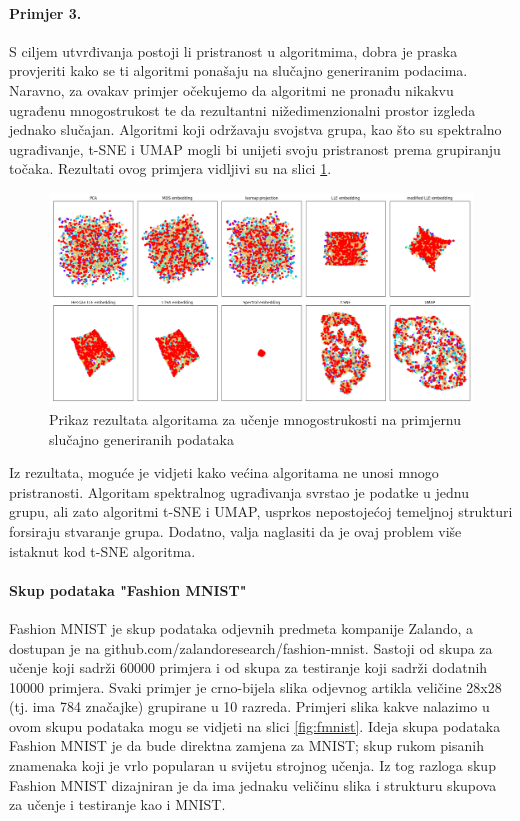 \documentclass[times, utf8, diplomski]{fer}
\begin{document}
\paragraph{Primjer 3.}
S ciljem utvrđivanja postoji li pristranost u algoritmima, dobra je praska provjeriti kako se ti algoritmi ponašaju na slučajno generiranim podacima. Naravno, za ovakav primjer očekujemo da algoritmi ne pronađu nikakvu ugrađenu mnogostrukost te da rezultantni nižedimenzionalni prostor izgleda jednako slučajan. Algoritmi koji održavaju svojstva grupa, kao što su spektralno ugrađivanje, t-SNE i UMAP mogli bi unijeti svoju pristranost prema grupiranju točaka. Rezultati ovog primjera vidljivi su na slici \ref{fig:xr}.

\begin{figure}[htb]
    \centering
    \includegraphics[width=\textwidth]{resources/images/reduction/compare/xr.png}
    \caption{Prikaz rezultata algoritama za učenje mnogostrukosti na primjernu slučajno generiranih podataka}
    \label{fig:xr}
\end{figure}

Iz rezultata, moguće je vidjeti kako većina algoritama ne unosi mnogo pristranosti. Algoritam spektralnog ugrađivanja svrstao je podatke u jednu grupu, ali zato algoritmi t-SNE i UMAP, usprkos nepostojećoj temeljnoj strukturi forsiraju stvaranje grupa. Dodatno, valja naglasiti da je ovaj problem više istaknut kod t-SNE algoritma.

\paragraph{Skup podataka "Fashion MNIST"}

Fashion MNIST je skup podataka odjevnih predmeta kompanije Zalando, a dostupan je na github.com/zalandoresearch/fashion-mnist. Sastoji od skupa za učenje koji sadrži 60000 primjera i od skupa za testiranje koji sadrži dodatnih 10000 primjera. Svaki primjer je crno-bijela slika odjevnog artikla veličine 28x28 (tj. ima 784 značajke) grupirane u 10 razreda. Primjeri slika kakve nalazimo u ovom skupu podataka mogu se vidjeti na slici \ref{fig:fmnist}. Ideja skupa podataka Fashion MNIST  je da bude direktna zamjena za MNIST; skup rukom pisanih znamenaka koji je vrlo popularan u svijetu strojnog učenja. Iz tog razloga skup Fashion MNIST dizajniran je da ima jednaku veličinu slika i strukturu skupova za učenje i testiranje kao i MNIST.
\end{document}
